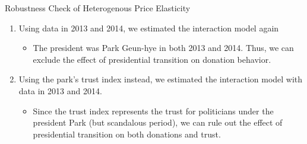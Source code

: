 \documentclass[
  ignorenonframetext,
]{beamer}
\providecommand{\tightlist}{%
  \setlength{\itemsep}{0pt}\setlength{\parskip}{0pt}}
\begin{document}
\begin{frame}{Robustness Check of Heterogenous Price Elasticity}
\protect\hypertarget{robustness-check-of-heterogenous-price-elasticity}{}

\begin{enumerate}
\tightlist
\item
  Using data in 2013 and 2014, we estimated the interaction model again

  \begin{itemize}
  \tightlist
  \item
    The president was Park Geun-hye in both 2013 and 2014. Thus, we can
    exclude the effect of presidential transition on donation behavior.
  \end{itemize}
\item
  Using the park's trust index instead, we estimated the interaction
  model with data in 2013 and 2014.

  \begin{itemize}
  \tightlist
  \item
    Since the trust index represents the trust for politicians under the
    president Park (but scandalous period), we can rule out the effect
    of presidential transition on both donations and trust.
  \end{itemize}
\end{enumerate}

\end{frame}
\end{document}
